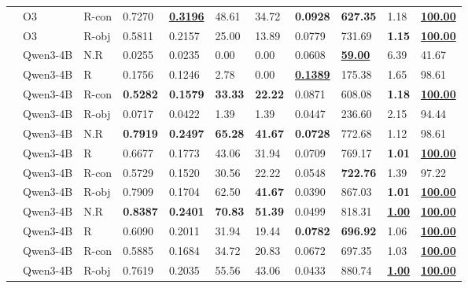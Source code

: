 \begin{table}[t]
\begin{tabular*}{\textwidth}{@{\extracolsep{\fill}}lllllllllll@{}}
			& O3 & R-con & 0.7270 & \underline{\textbf{0.3196}} & 48.61 & 34.72 & \textbf{0.0928} & \textbf{627.35} & 1.18 & \underline{\textbf{100.00}} \\
			& O3 & R-obj & 0.5811 & 0.2157 & 25.00 & 13.89 & 0.0779 & 731.69 & \textbf{1.15} & \underline{\textbf{100.00}} \\
			& Qwen3-4B & N.R & 0.0255 & 0.0235 & 0.00 & 0.00 & 0.0608 & \underline{\textbf{59.00}} & 6.39 & 41.67 \\
			& Qwen3-4B & R & 0.1756 & 0.1246 & 2.78 & 0.00 & \underline{\textbf{0.1389}} & 175.38 & 1.65 & 98.61 \\
			& Qwen3-4B & R-con & \textbf{0.5282} & \textbf{0.1579} & \textbf{33.33} & \textbf{22.22} & 0.0871 & 608.08 & \textbf{1.18} & \underline{\textbf{100.00}} \\
			& Qwen3-4B & R-obj & 0.0717 & 0.0422 & 1.39 & 1.39 & 0.0447 & 236.60 & 2.15 & 94.44 \\
			\midrule
			 & Qwen3-4B & N.R & \textbf{0.7919} & \textbf{0.2497} & \textbf{65.28} & \textbf{41.67} & \textbf{0.0728} & 772.68 & 1.12 & 98.61 \\
			& Qwen3-4B & R & 0.6677 & 0.1773 & 43.06 & 31.94 & 0.0709 & 769.17 & \textbf{1.01} & \underline{\textbf{100.00}} \\
			& Qwen3-4B & R-con & 0.5729 & 0.1520 & 30.56 & 22.22 & 0.0548 & \textbf{722.76} & 1.39 & 97.22 \\
			& Qwen3-4B & R-obj & 0.7909 & 0.1704 & 62.50 & \textbf{41.67} & 0.0390 & 867.03 & \textbf{1.01} & \underline{\textbf{100.00}} \\
			\midrule
			 & Qwen3-4B & N.R & \textbf{0.8387} & \textbf{0.2401} & \textbf{70.83} & \textbf{51.39} & 0.0499 & 818.31 & \underline{\textbf{1.00}} & \underline{\textbf{100.00}} \\
			& Qwen3-4B & R & 0.6090 & 0.2011 & 31.94 & 19.44 & \textbf{0.0782} & \textbf{696.92} & 1.06 & \underline{\textbf{100.00}} \\
			& Qwen3-4B & R-con & 0.5885 & 0.1684 & 34.72 & 20.83 & 0.0672 & 697.35 & 1.03 & \underline{\textbf{100.00}} \\
			& Qwen3-4B & R-obj & 0.7619 & 0.2035 & 55.56 & 43.06 & 0.0433 & 880.74 & \underline{\textbf{1.00}} & \underline{\textbf{100.00}} \\

\end{tabular*}
\end{table}
